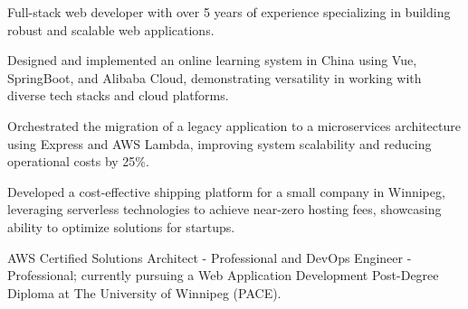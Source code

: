 

\vspace{3mm}
\begin{cvparagraph}

    \begin{cvitems} %
        \item {Full-stack web developer with over 5 years of experience specializing in building robust and scalable web applications.}
        \item {Designed and implemented an online learning system in China using Vue, SpringBoot, and Alibaba Cloud, demonstrating versatility in working with diverse tech stacks and cloud platforms.}
        \item {Orchestrated the migration of a legacy application to a microservices architecture using Express and AWS Lambda, improving system scalability and reducing operational costs by 25\%.}
        \item {Developed a cost-effective shipping platform for a small company in Winnipeg, leveraging serverless technologies to achieve near-zero hosting fees, showcasing ability to optimize solutions for startups.}
        \item {AWS Certified Solutions Architect - Professional and DevOps Engineer - Professional; currently pursuing a Web Application Development Post-Degree Diploma at The University of Winnipeg (PACE).}
    \end{cvitems}

\end{cvparagraph}


